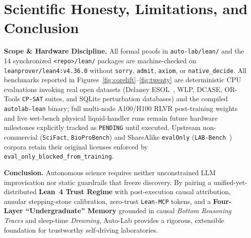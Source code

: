 \documentclass[10pt,letterpaper]{article}
\begin{document}
\section{Scientific Honesty, Limitations, and Conclusion}

\textbf{Scope \& Hardware Discipline.} All formal proofs in \texttt{auto-lab/lean/} and the 14 synchronized \texttt{<repo>/lean/} packages are machine-checked on \texttt{leanprover/lean4:v4.36.0} without \texttt{sorry}, \texttt{admit}, \texttt{axiom}, or \texttt{native\_decide}. All benchmarks reported in Figures~\ref{fig:corelift}--\ref{fig:twenty} are deterministic CPU evaluations invoking real open datasets (Delaney ESOL~\cite{delaney2004esol}, WLP, DCASE, OR-Tools \texttt{CP-SAT} suites, and SQLite perturbation databases) and the compiled \texttt{autolab-lean} binary; full multi-node A100/H100 RLVR post-training weights and live wet-bench physical liquid-handler runs remain future hardware milestones explicitly tracked as \texttt{PENDING} until executed. Upstream non-commercial (\texttt{SciFact}, \texttt{BioProBench}) and ShareAlike \texttt{evalOnly} (\texttt{LAB-Bench}~\cite{laurent2024labbench}) corpora retain their original licenses enforced by \texttt{eval\_only\_blocked\_from\_training}.

\textbf{Conclusion.} Autonomous science requires neither unconstrained LLM improvisation nor static guardrails that freeze discovery. By pairing a unified-yet-distributed \textbf{Lean~4 Trust Regime} with post-execution causal attribution, annular stepping-stone calibration, zero-trust \texttt{Lean-MCP} tokens, and a \textbf{Four-Layer ``Undergraduate'' Memory} grounded in causal \emph{Bottom Reasoning Traces} and sleep-time \emph{Dreaming}, Auto-Lab provides a rigorous, extensible foundation for trustworthy self-driving laboratories.



\end{document}
